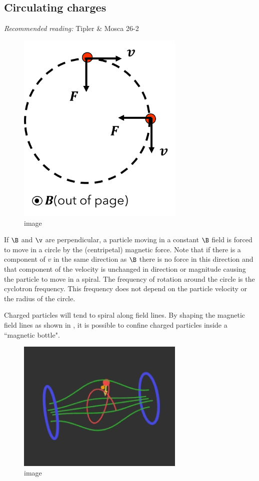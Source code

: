 \documentclass[
]{book}
\begin{document}
\hypertarget{circulating-charges}{%
\subsection{Circulating charges}\label{circulating-charges}}

\emph{Recommended reading:} Tipler \& Mosca 26-2

\begin{figure}
\centering
\includegraphics[width=80mm,height=\textheight]{Figures/circular_path.png}
\caption{image}
\end{figure}

If \(\B\) and \(\v\) are perpendicular, a particle moving in a constant \(\B\)
field is forced to move in a circle by the (centripetal) magnetic force.
Note that if there is a component of \(v\) in the same direction as \(\B\)
there is no force in this direction and that component of the velocity
is unchanged in direction or magnitude causing the particle to move in a
spiral. The frequency of rotation around the circle is the cyclotron
frequency. This frequency does not depend on the particle velocity or
the radius of the circle.

Charged particles will tend to spiral along field lines. By shaping the
magnetic field lines as shown in , it is possible to confine charged
particles inside a ``magnetic bottle".

\begin{figure}
\centering
\includegraphics[width=80mm,height=\textheight]{Figures/magBottle.png}
\caption{image}
\end{figure}
\end{document}
